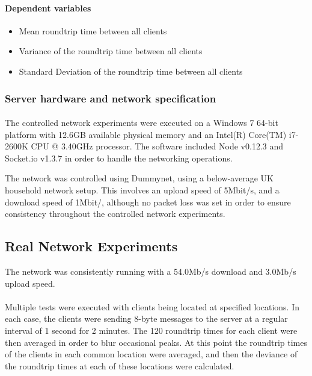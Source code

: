 \documentclass[bsc,frontabs,twoside,singlespacing,parskip,deptreport]{infthesis}     %
\begin{document}
\paragraph{Dependent variables}
\begin{itemize}
\item Mean roundtrip time between all clients
\item Variance of the roundtrip time between all clients
\item Standard Deviation of the roundtrip time between all clients
\end{itemize}

\subsubsection{Server hardware and network specification}
\paragraph{}The controlled network experiments were executed on a Windows 7 64-bit platform with 12.6GB available physical memory and an Intel(R) Core(TM) i7-2600K CPU @ 3.40GHz processor. The software included Node v0.12.3 and Socket.io v1.3.7 in order to handle the networking operations.

The network was controlled using Dummynet, using a below-average UK household network setup. This involves an upload speed of 5Mbit/s, and a download speed of 1Mbit/, although no packet loss was set in order to ensure consistency throughout the controlled network experiments.

\subsection{Real Network Experiments}
The network was consistently running with a 54.0Mb/s download and 3.0Mb/s upload speed.
\paragraph{}Multiple tests were executed with clients being located at specified locations. In each case, the clients were sending 8-byte messages to the server at a regular interval of 1 second for 2 minutes. The 120 roundtrip times for each client were then averaged in order to blur occasional peaks. At this point the roundtrip times of the clients in each common location were averaged, and then the deviance of the roundtrip times at each of these locations were calculated.
\end{document}
